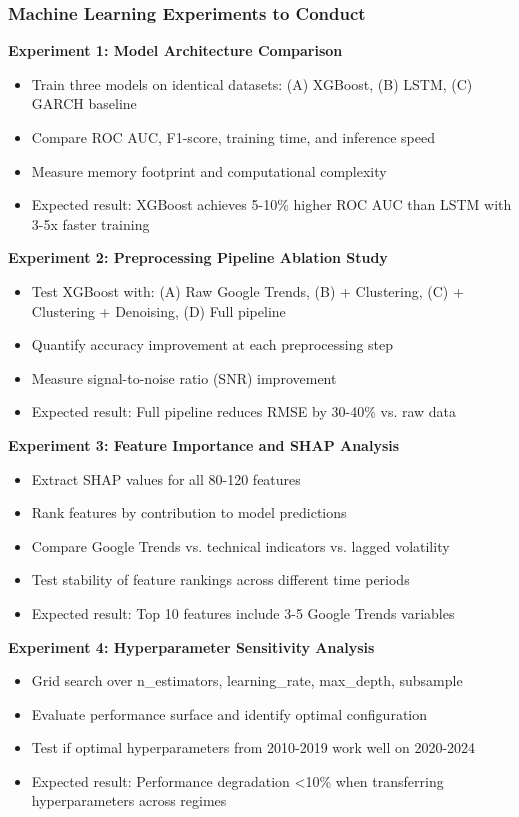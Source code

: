 \documentclass[12pt,a4paper]{article}
\begin{document}
\subsubsection{Machine Learning Experiments to Conduct}

\textbf{Experiment 1: Model Architecture Comparison}
\begin{itemize}
    \item Train three models on identical datasets: (A) XGBoost, (B) LSTM, (C) GARCH baseline
    \item Compare ROC AUC, F1-score, training time, and inference speed
    \item Measure memory footprint and computational complexity
    \item Expected result: XGBoost achieves 5-10\% higher ROC AUC than LSTM with 3-5x faster training
\end{itemize}

\textbf{Experiment 2: Preprocessing Pipeline Ablation Study}
\begin{itemize}
    \item Test XGBoost with: (A) Raw Google Trends, (B) + Clustering, (C) + Clustering + Denoising, (D) Full pipeline
    \item Quantify accuracy improvement at each preprocessing step
    \item Measure signal-to-noise ratio (SNR) improvement
    \item Expected result: Full pipeline reduces RMSE by 30-40\% vs. raw data
\end{itemize}

\textbf{Experiment 3: Feature Importance and SHAP Analysis}
\begin{itemize}
    \item Extract SHAP values for all 80-120 features
    \item Rank features by contribution to model predictions
    \item Compare Google Trends vs. technical indicators vs. lagged volatility
    \item Test stability of feature rankings across different time periods
    \item Expected result: Top 10 features include 3-5 Google Trends variables
\end{itemize}

\textbf{Experiment 4: Hyperparameter Sensitivity Analysis}
\begin{itemize}
    \item Grid search over n\_estimators, learning\_rate, max\_depth, subsample
    \item Evaluate performance surface and identify optimal configuration
    \item Test if optimal hyperparameters from 2010-2019 work well on 2020-2024
    \item Expected result: Performance degradation <10\% when transferring hyperparameters across regimes
\end{itemize}
\end{document}
